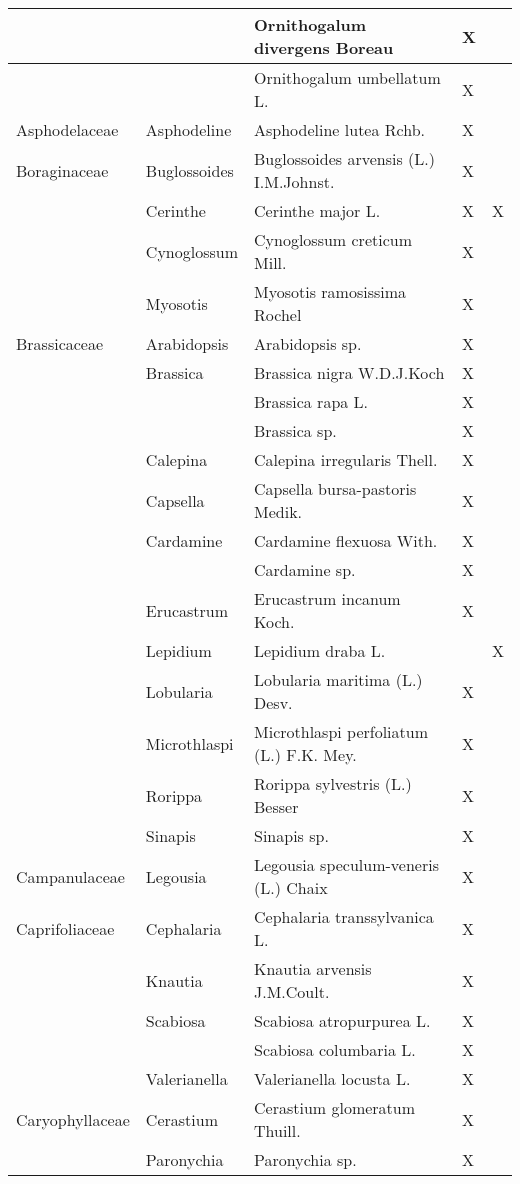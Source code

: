 \documentclass[main.tex]{subfiles}
\begin{document}
\begin{table}[!ht]
\begin{tabular}[\footnotesize]{|p{2.4cm}|p{1.9cm}|p{5.8cm}|p{1.1cm}|p{1cm}|}
        ~ & ~ & Ornithogalum divergens Boreau & X & ~ \\ \hline
        ~ & ~ & Ornithogalum umbellatum L. & X & ~ \\ \hline
        Asphodelaceae & Asphodeline & Asphodeline lutea Rchb. & X & ~ \\ \hline
        Boraginaceae & Buglossoides & Buglossoides arvensis (L.) I.M.Johnst. & X & ~ \\ \hline
        ~ & Cerinthe & Cerinthe major L. & X & X \\ \hline
        ~ & Cynoglossum & Cynoglossum creticum Mill. & X & ~ \\ \hline
        ~ & Myosotis & Myosotis ramosissima Rochel & X & ~ \\ \hline
        Brassicaceae & Arabidopsis & Arabidopsis sp. & X & ~ \\ \hline
        ~ & Brassica & Brassica nigra W.D.J.Koch & X & ~ \\ \hline
        ~ & ~ & Brassica rapa L. & X & ~ \\ \hline
        ~ & ~ & Brassica sp. & X & ~ \\ \hline
        ~ & Calepina & Calepina irregularis Thell. & X & ~ \\ \hline
        ~ & Capsella & Capsella bursa-pastoris Medik. & X & ~ \\ \hline
        ~ & Cardamine & Cardamine flexuosa With. & X & ~ \\ \hline
        ~ & ~ & Cardamine sp. & X & ~ \\ \hline
        ~ & Erucastrum  & Erucastrum incanum Koch. & X & ~ \\ \hline
        ~ & Lepidium & Lepidium draba L. & ~ & X \\ \hline
        ~ & Lobularia & Lobularia maritima (L.) Desv. & X & ~ \\ \hline
        ~ & Microthlaspi & Microthlaspi perfoliatum (L.) F.K. Mey. & X & ~ \\ \hline
        ~ & Rorippa & Rorippa sylvestris (L.) Besser & X & ~ \\ \hline
        ~ & Sinapis & Sinapis sp. & X & ~ \\ \hline
        Campanulaceae & Legousia & Legousia speculum-veneris (L.) Chaix & X & ~ \\ \hline
        Caprifoliaceae & Cephalaria & Cephalaria transsylvanica L. & X & ~ \\ \hline
        ~ & Knautia & Knautia arvensis J.M.Coult. & X & ~ \\ \hline
        ~ & Scabiosa & Scabiosa atropurpurea L. & X & ~ \\ \hline
        ~ & ~ & Scabiosa columbaria L. & X & ~ \\ \hline
        ~ & Valerianella & Valerianella locusta L. & X & ~ \\ \hline
        Caryophyllaceae & Cerastium & Cerastium glomeratum Thuill. & X & ~ \\ \hline
        ~ & Paronychia & Paronychia sp. & X & ~ \\ \hline
            \end{tabular}
    \end{table}
    
\end{document}
